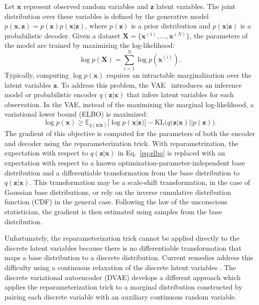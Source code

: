 \documentclass{article}
\newcommand{\x}{{\pmb{x}}}
\newcommand{\z}{{\pmb{z}}}
\newcommand{\E}{{\mathbb{E}}}
\def\KL{\text{KL}}
\begin{document}
Let $\x$ represent observed random variables and $\z$ latent variables. The joint distribution 
over these variables is defined by the generative model $p(\x, \z) = p(\z) p(\x|\z)$, where $p(\z)$
is a prior distribution and $p(\x|\z)$ is a probabilistic decoder. Given a dataset $\pmb{X} = \{\x^{(1)}, \dots, \x^{(N)}\}$,
the parameters of the model are trained by maximizing the log-likelihood:
\begin{equation}
 \log p(\pmb{X}) = \sum_{i=1}^N \log p(\x^{(i)}). \nonumber
\end{equation}
Typically, computing $\log p(\x)$ requires an intractable marginalization over the latent variables $\z$.
To address this problem, the VAE~\cite{kingma2014vae}
introduces an inference model or probabilistic encoder $q(\z|\x)$ that infers latent
variables for each observation. In the VAE, instead of the maximizing the marginal log-likelihood, a variational lower bound (ELBO) is maximized:
\begin{equation} \label{eq:elbo}
 \log p(\x) \geq \E_{q(\z|\x)}\bigl[\log p(\x|\z)\bigr] - \KL\bigl(q(\z|\x) || p(\z)\bigr).
\end{equation}
The gradient of this objective is computed for the parameters of both the encoder and decoder 
using the reparameterization trick. With reparametrization, the expectation with respect to $q(\z|\x)$ in Eq.~\eqref{eq:elbo}
is replaced with an expectation with respect to a known optimization-parameter-independent base distribution and a 
differentiable transformation from the base distribution to $q(\z|\x)$. This transformation may be a scale-shift transformation, in the case of Gaussian base distributions, or rely on the inverse cumulative distribution function (CDF) in the general case. Following the law of the unconscious statistician, 
the gradient is then estimated using samples from the base distribution.

Unfortunately, the reparameterization trick cannot be applied directly to the discrete latent variables 
because there is no differentiable transformation that maps a base distribution to a discrete distribution. 
Current remedies address this difficulty using a continuous relaxation of the discrete latent variables \cite{maddison2016concrete, jang2016categorical}. 
The discrete variational autoencoder (DVAE) \cite{rolfe2016discrete} develops a different approach 
which applies the reparameterization trick to a marginal distribution constructed by pairing each discrete variable with an auxiliary continuous random 
variable.
\end{document}
